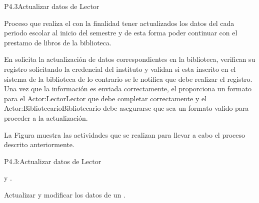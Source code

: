 
\begin{Proceso}{P4.3}{Actualizar datos de Lector} {
  

  Proceso que realiza el  con la finalidad tener actualizados los datos del  cada periodo escolar al inicio del semestre y de esta forma poder continuar con el prestamo de libros de la biblioteca.
  
  En  solicita la actualización de datos correspondientes en la biblioteca, verifican su registro  solicitando la credencial del instituto y validan si esta inscrito en el sistema de la biblioteca de lo contrario se le notifica que debe realizar el registro. 
  Una vez que la información es enviada correctamente, el   proporciona un formato para el {Actor:Lector}{Lector} que debe completar correctamente y el {Actor:Bibliotecario}{Bibliotecario} debe asegurarse  que sea un formato valido para proceder a la actualización.   



  \noindent La Figura  muestra las actividades que se realizan para llevar a cabo el proceso descrito anteriormente.


} {P4.3:Actualizar datos de Lector}


   { %
     y .
  }

   { %
    Actualizar y modificar los  datos de un .
  }


\end{Proceso}

